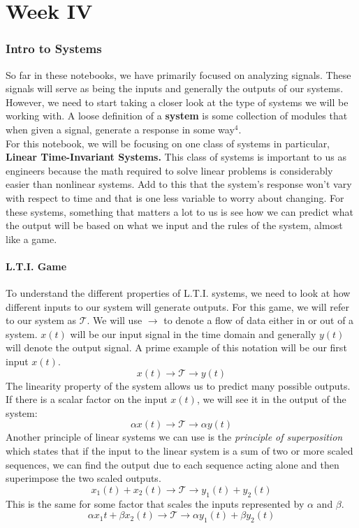 \documentclass[12pt]{article}
\newcommand{\partcontent}{}
\begin{document}
\noindent\makebox[\linewidth]{\rule{\paperwidth}{0.4pt}}

\part*{Week IV}
\renewcommand\partcontent{Week IV}
\section{Intro to Systems}
So far in these notebooks, we have primarily focused on analyzing signals. These signals will serve as being the inputs and generally the outputs of our systems. However, we need to start taking a closer look at the type of systems we will be working with. A loose definition of a \textbf{system} is some collection of modules that when given a signal, generate a response in some way$^4$. \\

For this notebook, we will be focusing on one class of systems in particular, \textbf{Linear Time-Invariant Systems.} This class of systems is important to us as engineers because the math required to solve linear problems is considerably easier than nonlinear systems. Add to this that the system's response won't vary with respect to time and that is one less variable to worry about changing. For these systems, something that matters a lot to us is see how we can predict what the output will be based on what we input and the rules of the system, almost like a game.


\subsection{L.T.I. Game}
To understand the different properties of L.T.I. systems, we need to look at how different inputs to our system will generate outputs. For this game, we will refer to our system as $\mathscr{T}$. We will use $\rightarrow$  to denote a flow of data either in or out of a system. $x(t)$ will be our input signal in the time domain and generally $y(t)$ will denote the output signal. A prime example of this notation will be our first input $x(t)$. $$x(t) \rightarrow \mathscr{T} \rightarrow y(t) $$
The linearity property of the system allows us to predict many possible outputs. If there is a scalar factor on the input $x(t)$, we will see it in the output of the system: $$\alpha x(t) \rightarrow \mathscr{T} \rightarrow \alpha y(t) $$ Another principle of linear systems we can use is the \textit{principle of superposition} which states that if the input to the linear system is a sum of two or more scaled sequences, we can find the output due to each sequence acting alone and then superimpose the two scaled outputs. $$x_1(t) + x_2(t) \rightarrow \mathscr{T} \rightarrow y_1(t) + y_2(t) $$ This is the same for some factor that scales the inputs represented by $\alpha$ and $\beta$. $$\alpha x_1{t} + \beta x_2(t) \rightarrow \mathscr{T} \rightarrow \alpha y_1(t) + \beta y_2(t) $$
\end{document}
